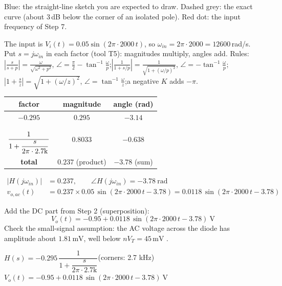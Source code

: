 \documentclass[11pt]{article}
\newcommand{\solstep}[2]{\par\medskip{\color{stepc}\textbf{Step #1 --- #2}}\par\nopagebreak}
\begin{document}
{\small Blue: the straight-line sketch you are expected to draw. Dashed grey: the exact curve (about 3\,dB below the corner of an isolated pole). Red dot: the input frequency of Step 7.}
\solstep{7}{Total output (DC + AC)}The input is $V_i(t) = 0.05\sin\left(2\pi\cdot 2000\,t\right)$, so $\omega_{in} = 2\pi\cdot 2000 = 12600$\,rad/s. Put $s=j\omega_{in}$ in each factor (tool T5): magnitudes multiply, angles add.
{\small Rules: $\left|\frac{s}{s+p}\right| = \frac{\omega}{\sqrt{\omega^2+p^2}}$, $\angle = \frac{\pi}{2}-\tan^{-1}\frac{\omega}{p}$;\quad $\left|\frac{1}{1+s/p}\right| = \frac{1}{\sqrt{1+(\omega/p)^2}}$, $\angle = -\tan^{-1}\frac{\omega}{p}$;\quad $\left|1+\frac{s}{z}\right| = \sqrt{1+(\omega/z)^2}$, $\angle = \tan^{-1}\frac{\omega}{z}$;\quad a negative $K$ adds $-\pi$.}
\begin{center}\renewcommand{\arraystretch}{1.35}
\begin{tabular}{ccc}
\toprule
factor & magnitude & angle (rad) \\
\midrule
$-0.295$ & $0.295$ & $-3.14$ \\
$\rule[-1.7em]{0pt}{4em}\dfrac{1}{1+\dfrac{s}{2\pi\cdot 2.7\mathrm{k}}}$ & $0.8033$ & $-0.638$ \\
\textbf{total} & $\mathbf{0.237}$ (product) & $\mathbf{-3.78}$ (sum) \\
\bottomrule
\end{tabular}\end{center}

\begin{align*}
|H(j\omega_{in})| &= 0.237, \qquad \angle H(j\omega_{in}) = -3.78\ \mathrm{rad} \\
v_{o,ac}(t) &= 0.237\times 0.05\,\sin\left(2\pi\cdot 2000\,t - 3.78\right) = 0.0118\,\sin\left(2\pi\cdot 2000\,t - 3.78\right)
\end{align*}

Add the DC part from Step 2 (superposition):
\[
\boxed{V_o(t) = -0.95 + 0.0118\,\sin\left(2\pi\cdot 2000\,t - 3.78\right)\ \mathrm{V}}
\]
 Check the small-signal assumption: the AC voltage across the diode has amplitude about $1.81\,\mathrm{m}\mathrm{V}$, well below $nV_T = 45\,\mathrm{m}\mathrm{V}$ \checkmark.
\begin{ansbox}
$H(s) = -0.295\,\dfrac{1}{1+\dfrac{s}{2\pi\cdot 2.7\mathrm{k}}}$\quad (corners: 2.7 kHz)\\[4pt]
$V_o(t) = -0.95 + 0.0118\,\sin\left(2\pi\cdot 2000\,t - 3.78\right)\ \mathrm{V}$
\end{ansbox}

\newpage
\end{document}
